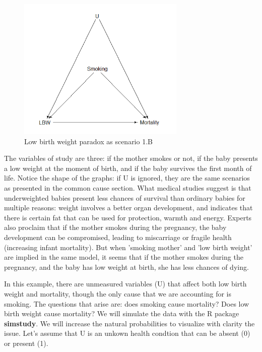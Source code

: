 \documentclass{article}
\begin{document}
\begin{figure}[h]
\caption{Low birth weight paradox as scenario 1.B}
\includegraphics[width=8cm]{LBW2DAG.png}
\centering
\end{figure}
\newpage
The variables of study are three: if the mother smokes or not, if the baby presents a low weight at the moment of birth, and if the baby survives the first month of life. Notice the shape of the graphs: if U is ignored, they are the same scenarios as presented in the common cause section. What medical studies suggest is that underweighted babies present less chances of survival than ordinary babies for multiple reasons: weight involves a better organ development, and indicates that there is certain fat that can be used for protection, warmth and energy. Experts also proclaim that if the mother smokes during the pregnancy, the baby development can be compromised, leading to miscarriage or fragile health (increasing infant mortality). But when 'smoking mother' and 'low birth weight' are implied in the same model, it seems that if the mother smokes during the pregnancy, and the baby has low weight at birth, she has less chances of dying. \par
In this example, there are unmeasured variables (U) that affect both low birth weight and mortality, though the only cause that we are accounting for is smoking. The questions that arise are: does smoking cause mortality? Does low birth weight cause mortality? We will simulate the data with the R package \textbf{simstudy}. We will increase the natural probabilities to visualize with clarity the issue. Let's assume that U is an unkown health condtion that can be absent (0) or present (1).\par
\end{document}
